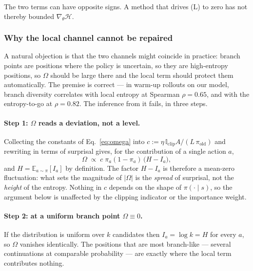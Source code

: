 \documentclass[11pt]{article}
\newcommand{\Htraj}{\mathcal{H}}
\newcommand{\Om}{\Omega}
\newcommand{\E}{\mathbb{E}}
\newcommand{\gradt}{\nabla_{\theta}}
\begin{document}
The two terms can have opposite signs. A method that drives (L) to zero has not
thereby bounded $\gradt \Htraj$.

\subsubsection{Why the local channel cannot be repaired}
\label{sec:blind-app}

A natural objection is that the two channels might coincide in practice: branch
points are positions where the policy is uncertain, so they are high-entropy
positions, so $\Om$ should be large there and the local term should protect them
automatically. The premise is correct --- in warm-up rollouts on our model, branch
diversity correlates with local entropy at Spearman $\rho = 0.65$, and with the
entropy-to-go at $\rho = 0.82$. The inference from it fails, in three steps.

\paragraph{Step 1: $\Om$ reads a deviation, not a level.}
Collecting the constants of Eq.~\eqref{eq:omega} into
$c := \eta\,\mathbb{I}_{\mathrm{clip}} A / (L\,\pi_{\mathrm{old}})$ and rewriting in
terms of surprisal gives, for the contribution of a single action $a$,
%
\begin{equation}
\Om \;\propto\; c\;\pi_a(1-\pi_a)\,\bigl(H - I_a\bigr),
\label{eq:omega-surprisal}
\end{equation}
%
and $H = \E_{a\sim\pi}[I_a]$ by definition. The factor $H - I_a$ is therefore a
mean-zero fluctuation: what sets the magnitude of $|\Om|$ is the \emph{spread} of
surprisal, not the \emph{height} of the entropy. Nothing in $c$ depends on the shape
of $\pi(\cdot \mid s)$, so the argument below is unaffected by the clipping
indicator or the importance weight.

\paragraph{Step 2: at a uniform branch point $\Om \equiv 0$.}
If the distribution is uniform over $k$ candidates then $I_a = \log k = H$ for every
$a$, so $\Om$ vanishes identically. The positions that are most branch-like --- several
continuations at comparable probability --- are exactly where the local term
contributes nothing.
\end{document}
